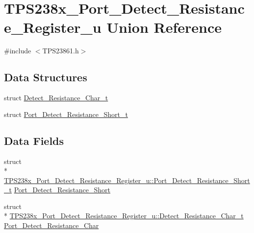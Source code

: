 \hypertarget{union_t_p_s238x___port___detect___resistance___register__u}{\section{T\-P\-S238x\-\_\-\-Port\-\_\-\-Detect\-\_\-\-Resistance\-\_\-\-Register\-\_\-u Union Reference}
\label{union_t_p_s238x___port___detect___resistance___register__u}
}


{\ttfamily \#include $<$T\-P\-S23861.\-h$>$}

\subsection*{Data Structures}
\begin{DoxyCompactItemize}
\item 
struct \hyperlink{struct_t_p_s238x___port___detect___resistance___register__u_1_1_detect___resistance___char__t}{Detect\-\_\-\-Resistance\-\_\-\-Char\-\_\-t}
\item 
struct \hyperlink{struct_t_p_s238x___port___detect___resistance___register__u_1_1_port___detect___resistance___short__t}{Port\-\_\-\-Detect\-\_\-\-Resistance\-\_\-\-Short\-\_\-t}
\end{DoxyCompactItemize}
\subsection*{Data Fields}
\begin{DoxyCompactItemize}
\item 
struct \\*
\hyperlink{struct_t_p_s238x___port___detect___resistance___register__u_1_1_port___detect___resistance___short__t}{T\-P\-S238x\-\_\-\-Port\-\_\-\-Detect\-\_\-\-Resistance\-\_\-\-Register\-\_\-u\-::\-Port\-\_\-\-Detect\-\_\-\-Resistance\-\_\-\-Short\-\_\-t} \hyperlink{union_t_p_s238x___port___detect___resistance___register__u_a7ce5b3c8a626eb76dc3218be69a3af03}{Port\-\_\-\-Detect\-\_\-\-Resistance\-\_\-\-Short}
\item 
struct \\*
\hyperlink{struct_t_p_s238x___port___detect___resistance___register__u_1_1_detect___resistance___char__t}{T\-P\-S238x\-\_\-\-Port\-\_\-\-Detect\-\_\-\-Resistance\-\_\-\-Register\-\_\-u\-::\-Detect\-\_\-\-Resistance\-\_\-\-Char\-\_\-t} \hyperlink{union_t_p_s238x___port___detect___resistance___register__u_abf4ff3f2dbb13bacf1cb9a1f392921e8}{Port\-\_\-\-Detect\-\_\-\-Resistance\-\_\-\-Char}
\end{DoxyCompactItemize}


